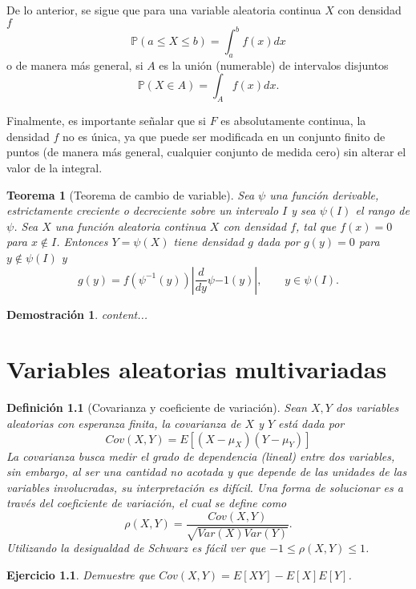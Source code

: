 \documentclass[11pt]{report}
\theoremstyle{break}
\newtheorem{definicion}{Definición}[chapter]
\newtheorem{teorema}{Teorema}[chapter]
\newtheorem*{demostracion}{Demostración}
\newtheorem{ejercicio}{Ejercicio}[chapter]
\theoremstyle{break}
\begin{document}
De lo anterior, se sigue que para una variable aleatoria continua $X$ con densidad $f$
$$
\mathbb{P}(a \leq X \leq b) = \int_{a}^{b}f(x)dx
$$
o de manera más general, si $A$ es la unión (numerable) de intervalos disjuntos
$$
\mathbb{P}(X \in A) = \int_{A}f(x)dx.
$$

Finalmente, es importante señalar que si $F$ es absolutamente continua, la densidad $f$ no es única, ya que puede ser modificada en un conjunto finito de puntos (de manera más general, cualquier conjunto de medida cero) sin alterar el valor de la integral.

\begin{teorema}[Teorema de cambio de variable]
\label{teorema:cambio de variable}
Sea $\psi$ una función derivable, estrictamente creciente o decreciente sobre un intervalo $I$ y sea $\psi(I)$ el rango de $\psi$. Sea $X$ una función aleatoria continua $X$ con densidad $f$, tal que $f(x) = 0$ para $x \notin I$. Entonces $Y = \psi(X)$ tiene densidad $g$ dada por $g(y) = 0$ para $y \notin \psi(I)$ y 
$$
g(y) = f(\psi^{-1}(y)) \left| \dfrac{d}{dy}\psi{-1}(y)\right|, \qquad y \in \psi(I).
$$
\end{teorema}

\begin{demostracion}
content...
\end{demostracion}

\chapter{Variables aleatorias multivariadas}
\label{capitulo:variables aleatorias multivariadas}
\begin{definicion}[Covarianza y coeficiente de variación]
\label{definicion:covarianza}
Sean $X,Y$ dos variables aleatorias con esperanza finita, la covarianza de $X$ y $Y$ está dada por
$$
Cov(X,Y) = E[(X - \mu_{X})(Y - \mu_{Y})]
$$
La covarianza busca medir el grado de dependencia (lineal) entre dos variables, sin embargo, al ser una cantidad no acotada y que depende de las unidades de las variables involucradas, su interpretación es difícil. Una forma de solucionar es a través del coeficiente de variación, el cual se define como
$$
\rho(X,Y) = \dfrac{ Cov(X,Y)  }{ \sqrt{Var(X) Var(Y)} }.
$$
Utilizando la desigualdad de Schwarz es fácil ver que $-1\leq \rho(X,Y) \leq 1$.
\end{definicion}


\begin{ejercicio}
Demuestre que $Cov(X,Y) = E[XY] - E[X]E[Y]$.
\end{ejercicio}
\end{document}
